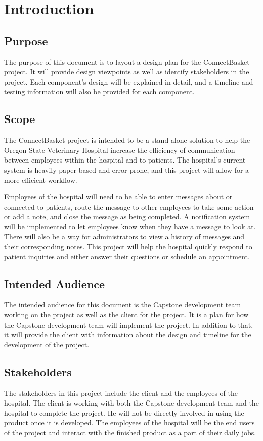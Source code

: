 \documentclass[onecolumn, draftclsnofoot,10pt, compsoc]{IEEEtran}
\begin{document}
\section{Introduction}

\subsection{Purpose}
The purpose of this document is to layout a design plan for the ConnectBasket project. It will provide design viewpoints as well as identify stakeholders in the project. Each component's design will be explained in detail, and a timeline and testing information will also be provided for each component.
\subsection{Scope}
The ConnectBasket project is intended to be a stand-alone solution to help the Oregon State Veterinary Hospital increase the efficiency of communication between employees within the hospital and to patients. The hospital's current system is heavily paper based and error-prone, and this project will allow for a more efficient workflow.

Employees of the hospital will need to be able to enter messages about or connected to patients, route the message to other employees to take some action or add a note, and close the message as being completed. A notification system will be implemented to let employees know when they have a message to look at. There will also be a way for administrators to view a history of messages and their corresponding notes. This project will help the hospital quickly respond to patient inquiries and either answer their questions or schedule an appointment.

\subsection{Intended Audience}
The intended audience for this document is the Capstone development team working on the project as well as the client for the project. It is a plan for how the Capstone development team will implement the project. In addition to that, it will provide the client with information about the design and timeline for the development of the project.

\subsection{Stakeholders}
The stakeholders in this project include the client and the employees of the hospital. The client is working with both the Capstone development team and the hospital to complete the project. He will not be directly involved in using the product once it is developed. The employees of the hospital will be the end users of the project and interact with the finished product as a part of their daily jobs.
\end{document}
